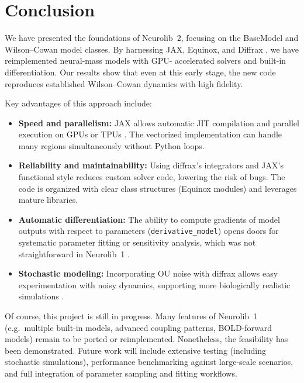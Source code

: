 \documentclass[11pt,a4paper]{article}
\begin{document}
\section{Conclusion}

We have presented the foundations of Neurolib~2, focusing on the BaseModel and Wilson--Cowan model
classes. By harnessing JAX, Equinox, and Diffrax \cite{kidger2021equinox,kidger2021neural}, we have reimplemented neural-mass models with GPU-
accelerated solvers and built-in differentiation. Our results show that even at this early stage, the new code
reproduces established Wilson--Cowan dynamics with high fidelity.

Key advantages of this approach include:
\begin{itemize}
\item \textbf{Speed and parallelism:} JAX allows automatic JIT compilation and parallel execution on GPUs or
TPUs \cite{kidger2021equinox}. The vectorized implementation can handle many regions simultaneously without Python loops.

\item \textbf{Reliability and maintainability:} Using diffrax’s integrators \cite{kidger2021neural} and JAX’s functional style reduces
custom solver code, lowering the risk of bugs. The code is organized with clear class structures
(Equinox modules) and leverages mature libraries.

\item \textbf{Automatic differentiation:} The ability to compute gradients of model outputs with respect to
parameters (\texttt{derivative\_model}) opens doors for systematic parameter fitting or sensitivity analysis,
which was not straightforward in Neurolib~1 \cite{kidger2021equinox}.

\item \textbf{Stochastic modeling:} Incorporating OU noise with diffrax allows easy experimentation with noisy
dynamics, supporting more biologically realistic simulations \cite{fellous2003synaptic}.
\end{itemize}

Of course, this project is still in progress. Many features of Neurolib~1 (e.g.\ multiple built-in models,
advanced coupling patterns, BOLD-forward models) remain to be ported or reimplemented. Nonetheless, the feasibility
has been demonstrated. Future work will include extensive testing (including stochastic simulations),
performance benchmarking against large-scale scenarios, and full integration of parameter sampling and
fitting workflows.
\end{document}
